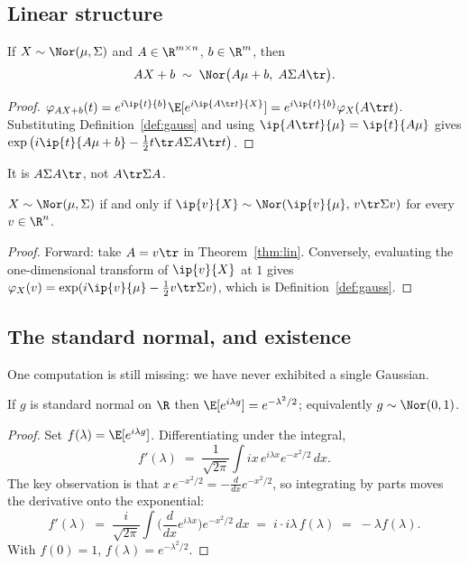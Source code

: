 \documentclass[11pt]{article}
\begin{document}
\subsection{Linear structure}

\begin{theorem}\label{thm:lin}
If $X\sim\Nor(\mu,\Sigma)$ and $A\in\R^{m\times n}$, $b\in\R^m$, then
\[
AX+b\;\sim\;\Nor\big(A\mu+b,\;A\Sigma A\tr\big).
\]
\end{theorem}

\begin{proof}
$\varphi_{AX+b}(t)=e^{i\ip{t}{b}}\E[e^{i\ip{A\tr t}{X}}]=e^{i\ip{t}{b}}\varphi_X(A\tr t)$. Substituting Definition~\ref{def:gauss} and using $\ip{A\tr t}{\mu}=\ip{t}{A\mu}$ gives $\exp\big(i\ip{t}{A\mu+b}-\tfrac12 t\tr A\Sigma A\tr t\big)$.
\end{proof}

\begin{remark}
It is $A\Sigma A\tr$, not $A\tr\Sigma A$.
\end{remark}

\begin{corollary}\label{cor:1d}
$X\sim\Nor(\mu,\Sigma)$ if and only if $\ip{v}{X}\sim\Nor(\ip{v}{\mu},\,v\tr\Sigma v)$ for every $v\in\R^n$.
\end{corollary}

\begin{proof}
Forward: take $A=v\tr$ in Theorem~\ref{thm:lin}. Conversely, evaluating the one-dimensional transform of $\ip{v}{X}$ at $1$ gives $\varphi_X(v)=\exp(i\ip{v}{\mu}-\tfrac12 v\tr\Sigma v)$, which is Definition~\ref{def:gauss}.
\end{proof}

\subsection{The standard normal, and existence}

One computation is still missing: we have never exhibited a single Gaussian.

\begin{lemma}\label{lem:phig}
If $g$ is standard normal on $\R$ then $\E[e^{i\lambda g}]=e^{-\lambda^2/2}$; equivalently $g\sim\Nor(0,1)$.
\end{lemma}

\begin{proof}
Set $f(\lambda)=\E[e^{i\lambda g}]$. Differentiating under the integral,
\[
f'(\lambda)\;=\;\frac{1}{\sqrt{2\pi}}\int ix\,e^{i\lambda x}e^{-x^2/2}\,dx .
\]
The key observation is that $x\,e^{-x^2/2}=-\frac{d}{dx}e^{-x^2/2}$, so integrating by parts moves the derivative onto the exponential:
\[
f'(\lambda)\;=\;\frac{i}{\sqrt{2\pi}}\int \Big(\frac{d}{dx}e^{i\lambda x}\Big)e^{-x^2/2}\,dx\;=\;i\cdot i\lambda\, f(\lambda)\;=\;-\lambda f(\lambda).
\]
With $f(0)=1$, $f(\lambda)=e^{-\lambda^2/2}$.
\end{proof}
\end{document}
